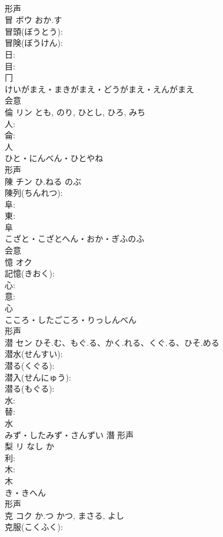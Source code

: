 \documentclass[8pt]{extreport}
\begin{document}
\begin{CJK}{UTF8}{min}
\\	形声 
\\	冒	ボウ	おか.す		
\\	冒頭(ぼうとう): 
\\	冒険(ぼうけん): 
\\	日: 
\\	目: 
\\	冂	
\\	けいがまえ・まきがまえ・どうがまえ・えんがまえ	
\\	会意 
\\	倫	リン		とも, のり, ひとし, ひろ, みち	
\\	人: 
\\	侖: 
\\	人	
\\	ひと・にんべん・ひとやね	
\\	形声 
\\	陳	チン	ひ.ねる	のぶ	
\\	陳列(ちんれつ): 
\\	阜: 
\\	東: 
\\	阜	
\\	こざと・こざとへん・おか・ぎふのふ	
\\	会意 
\\	憶	オク			
\\	記憶(きおく): 
\\	心: 
\\	意: 
\\	心	
\\	こころ・したごころ・りっしんべん	
\\	形声 
\\	潜	セン	ひそ.む、もぐ.る、かく.れる、くぐ.る、ひそ.める		
\\	潜水(せんすい): 
\\	潜る(くぐる): 
\\	潜入(せんにゅう): 
\\	潜る(もぐる): 
\\	水: 
\\	替: 
\\	水	
\\	みず・したみず・さんずい	潛	形声 
\\	梨	リ	なし	か	
\\	利: 
\\	木: 
\\	木	
\\	き・きへん	
\\	形声 
\\	克	コク	か.つ	かつ, まさる, よし	
\\	克服(こくふく): 

\end{CJK}
\end{document}
